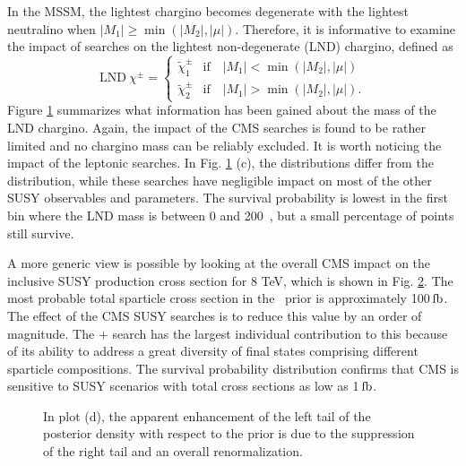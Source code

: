 In the MSSM, the lightest chargino becomes degenerate with the lightest neutralino when 
$|M_1| \geq \min(|M_2|,|\mu|)$.  
Therefore, it is informative to examine the impact of searches on 
the lightest non-degenerate (LND) chargino, defined as
\begin{equation}
    \mathrm{LND~}{\chi^\pm} =
    \begin{cases}
        \tilde{\chi}^\pm_1 & \mbox{if~~~} |M_1| < \min(|M_2|,|\mu|) \\
        \tilde{\chi}^\pm_2 & \mbox{if~~~} |M_1| > \min(|M_2|,|\mu|).
    \end{cases}
\end{equation}
Figure \ref{fig:mLNDw} summarizes what information has been gained about the mass of the 
LND chargino. 
Again, the impact of the CMS searches is found to be rather limited and no chargino mass
can be reliably excluded.
It is worth noticing the impact of the leptonic searches.
In Fig. \ref{fig:mLNDw} (c), the distributions differ from the \preCMS~ distribution,
while these searches have negligible impact on most of the other  SUSY observables and parameters. The survival probability is lowest in the first bin where the LND mass is between 0 and 200~\GeV, but a small percentage of points still survive.

\begin{figure}[t]
  \vspace{1mm}
  \caption{ }
  \label{fig:mLNDw}
\end{figure}

A more generic view is possible by looking at the overall CMS impact on the inclusive SUSY production cross section for 8 TeV, which is shown in Fig. \ref{fig:xsect}. 
The most probable total sparticle cross section in the \preCMS~prior is
approximately 100\,$\mathrm{fb}$. The effect of the CMS SUSY searches is to reduce this
value by an order of magnitude.  The \HT{}$+$\MHT{} search
has the largest individual contribution to this because of its ability to address a great diversity of final states comprising different sparticle compositions.  The survival probability distribution confirms that CMS is sensitive to SUSY scenarios with total cross sections as low as 1\,$\mathrm{fb}$. 
\begin{figure}[t]
    \vspace{1mm}
    \caption{ In plot (d), the apparent enhancement of the left tail of the posterior density with respect to the prior is due to the suppression of the right tail and an overall renormalization. }
    \label{fig:xsect}
\end{figure}


